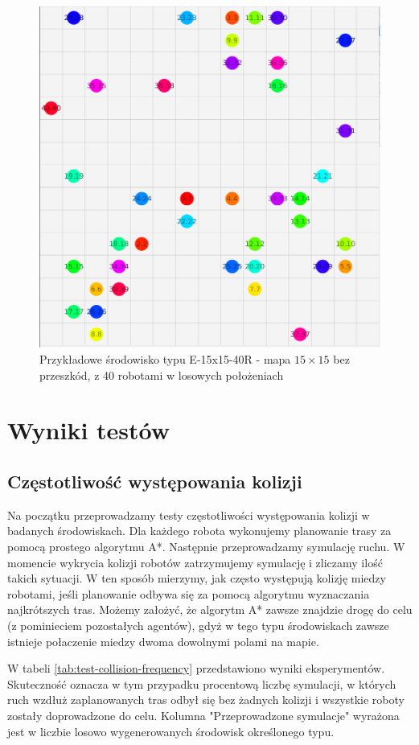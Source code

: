 \begin{figure}
	\centering
	\includegraphics[width=0.6\columnwidth]{img/robopath/tests-15-15-empty-40}
	\caption{Przykładowe środowisko typu E-15x15-40R - mapa $15 \times 15$ bez przeszkód, z 40 robotami w losowych położeniach}
	\label{fig:test-env-15-15-empty-40}
\end{figure}

\section{Wyniki testów}
\subsection{Częstotliwość występowania kolizji}
Na początku przeprowadzamy testy częstotliwości występowania kolizji w badanych środowiskach.
Dla każdego robota wykonujemy planowanie trasy za pomocą prostego algorytmu A*. Następnie przeprowadzamy symulację ruchu. W momencie wykrycia kolizji robotów zatrzymujemy symulację i zliczamy ilość takich sytuacji. W ten sposób mierzymy, jak często występują kolizję miedzy robotami, jeśli planowanie odbywa się za pomocą algorytmu wyznaczania najkrótszych tras.
Możemy założyć, że algorytm A* zawsze znajdzie drogę do celu (z pominieciem pozostałych agentów), gdyż w tego typu środowiskach zawsze istnieje połaczenie miedzy dwoma dowolnymi polami na mapie.

W tabeli \ref{tab:test-collision-frequency} przedstawiono wyniki eksperymentów. Skuteczność oznacza w tym przypadku procentową liczbę symulacji, w których ruch wzdłuż zaplanowanych tras odbył się bez żadnych kolizji i wszystkie roboty zostały doprowadzone do celu.
Kolumna "Przeprowadzone symulacje" wyrażona jest w liczbie losowo wygenerowanych środowisk określonego typu.

